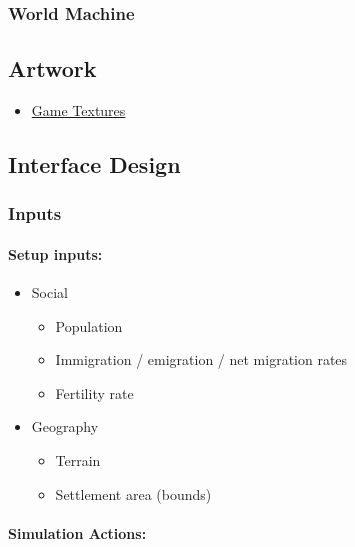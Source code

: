 \documentclass[]{article}
\begin{document}
\subsubsection{World Machine}\label{world-machine}

\subsection{Artwork}\label{artwork}

\begin{itemize}
\itemsep1pt\parskip0pt
\item
  \href{http://gametextures.com}{Game Textures}
\end{itemize}

\subsection{Interface Design}\label{interface-design}

\subsubsection{Inputs}\label{inputs}

\paragraph{Setup inputs:}\label{setup-inputs}

\begin{itemize}
\itemsep1pt\parskip0pt
\item
  Social

  \begin{itemize}
  \itemsep1pt\parskip0pt
  \item
    Population
  \item
    Immigration / emigration / net migration rates
  \item
    Fertility rate
  \end{itemize}
\item
  Geography

  \begin{itemize}
  \itemsep1pt\parskip0pt
  \item
    Terrain
  \item
    Settlement area (bounds)
  \end{itemize}
\end{itemize}

\paragraph{Simulation Actions:}\label{simulation-actions}
\end{document}
